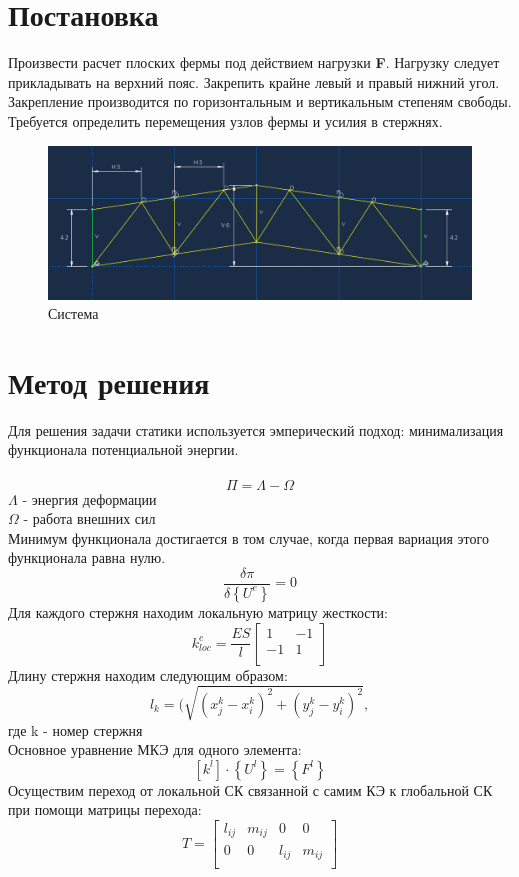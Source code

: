 \documentclass[12pt,a4paper]{article}
\begin{document}
	\vfill %
	
	\newpage
	\section{Постановка}
	Произвести расчет плоских фермы под действием нагрузки  \textbf{F}. Нагрузку следует
	прикладывать на верхний пояс. Закрепить крайне левый и правый нижний угол. Закрепление
	производится по горизонтальным и вертикальным степеням свободы. Требуется определить
	перемещения узлов фермы и усилия в стержнях.
	\begin{figure}[H]
		\centering
		\includegraphics[width=\textwidth]{system}
		\caption{Система}
		\label{pic1}
	\end{figure}
	\section{Метод решения}
	Для решения задачи статики используется эмперический подход: минимализация функционала потенциальной энергии.\\\\
	\[
		\Pi=\Lambda-\Omega
	\]
	$\Lambda$ - энергия деформации\\	
	$\Omega$ - работа внешних сил\\
	Минимум функционала достигается в том случае, когда первая вариация этого функционала равна нулю.\\
	\[\frac{\delta\pi}{\delta \left\{U^e\right\}}=0\]
	Для каждого стержня находим локальную матрицу жесткости:\\
	\[k_{loc}^e=\frac{ES}{l}\left[\begin{array}{ccc}
		1 & -1 \\
		-1 & 1 \\
	\end{array}\right]\]
	Длину стержня находим следующим образом:
	\[l_k=(\sqrt{(x_j^k-x_i^k)^2+(y_j^k-y_i^k)^2},\] где k - номер стержня\\
	Основное уравнение МКЭ для одного элемента:
	\[\left[k^l\right]\cdot{\left\{U^l\right\}}=\left\{F^l\right\}\]
	Осуществим переход от локальной СК связанной с самим КЭ к глобальной СК при помощи матрицы перехода:
		\begin{equation*}
			T=
				\begin{bmatrix}
					l_{ij} & m_{ij} & 0 & 0 \\
					0 & 0 & l_{ij} & m_{ij} \\
				\end{bmatrix} 
		\end{equation*}
	
\end{document}
